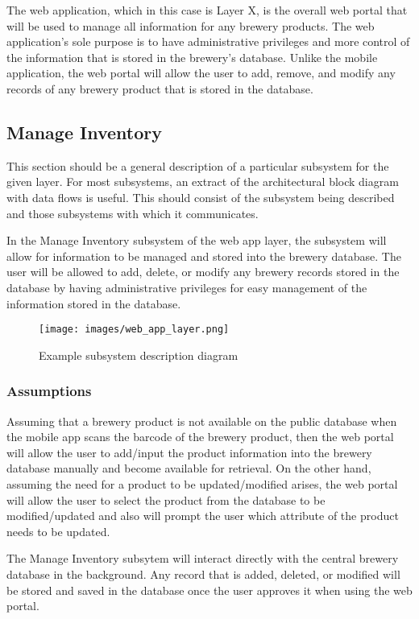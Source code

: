 The web application, which in this case is Layer X, is the overall web portal that will be used to manage all information for any brewery products.  The web application's sole purpose is to have administrative privileges and more control of the information that is stored in the brewery's database.  Unlike the mobile application, the web portal will allow the user to add, remove, and modify any records of any brewery product that is stored in the database.

\subsection{Manage Inventory}
This section should be a general description of a particular subsystem for the given layer. For most subsystems, an extract of the architectural block diagram with data flows is useful. This should consist of the subsystem being described and those subsystems with which it communicates.

In the Manage Inventory subsystem of the web app layer, the subsystem will allow for information to be managed and stored into the brewery database.  The user will be allowed to add, delete, or modify any brewery records stored in the database by having administrative privileges for easy management of the information stored in the database.

\begin{figure}[h!]
	\centering
 	\texttt{[image: images/web\_app\_layer.png]}
 \caption{Example subsystem description diagram}
\end{figure}

\subsubsection{Assumptions}
Assuming that a brewery product is not available on the public database when the mobile app scans the barcode of the brewery product, then the web portal will allow the user to add/input the product information into the brewery database manually and become available for retrieval.  On the other hand, assuming the need for a product to be updated/modified arises, the web portal will allow the user to select the product from the database to be modified/updated and also will prompt the user which attribute of the product needs to be updated.

The Manage Inventory subsytem will interact directly with the central brewery database in the background.  Any record that is added, deleted, or modified will be stored and saved in the database once the user approves it when using the web portal.

